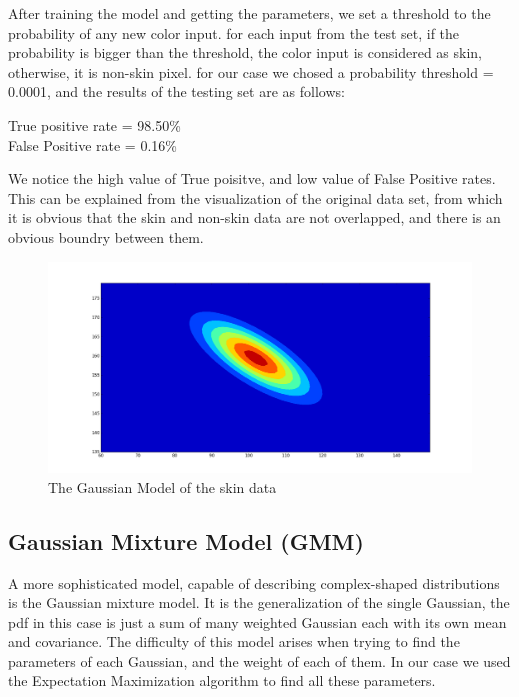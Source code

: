 \documentclass[12pt]{article} %
\begin{document}
After training the model and getting the parameters, we set a threshold to the probability of any new color input. for each input from the test set, if the probability is bigger than the threshold, the color input is considered as skin, otherwise, it is non-skin pixel. for our case we chosed a probability threshold = 0.0001, and the results of the testing set are as follows:

\begin{center}
True positive rate = 98.50\% \\
False Positive rate = 0.16\%
\end{center}   

We notice the high value of True poisitve, and low value of False Positive rates. This can be explained from the visualization of the original data set, from which it is obvious that the skin and non-skin data are not overlapped, and there is an obvious boundry between them.

\begin{figure}[H]
		\centering
		\includegraphics[width=\textwidth]{Gaussian-model.png}
		\caption{The Gaussian Model of the skin data}	
\end{figure}


\subsection{Gaussian Mixture Model (GMM)}

A more sophisticated model, capable of describing complex-shaped
distributions is the Gaussian mixture model. It is the generalization of the single Gaussian, the pdf in this case is just a sum of many weighted Gaussian each with its own mean and covariance. The difficulty of  this model arises when trying to find the parameters of each Gaussian, and the weight of each of them. In our case we used the Expectation Maximization algorithm to find all these parameters. \\
\end{document}

